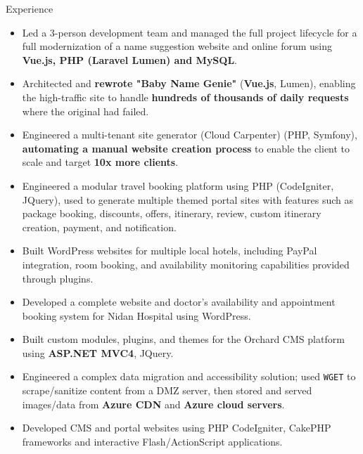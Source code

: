 \documentclass{resume} %
\begin{document}
\begin{rSection}{Experience}
\begin{itemize}
    \item Led a 3-person development team and managed the full project lifecycle for a full modernization of a name suggestion website and online forum using \textbf{Vue.js, PHP (Laravel Lumen) and MySQL}.
    \item Architected and \textbf{rewrote "Baby Name Genie"} (\textbf{Vue.js}, Lumen), enabling the high-traffic site to handle \textbf{hundreds of thousands of daily requests} where the original had failed.
    \item Engineered a multi-tenant site generator (Cloud Carpenter) (PHP, Symfony), \textbf{automating a manual website creation process} to enable the client to scale and target \textbf{10x more clients}.
\end{itemize}

\begin{itemize}
     \item Engineered a modular travel booking platform using PHP (CodeIgniter, JQuery), used to generate multiple themed portal sites with features such as package booking, discounts, offers, itinerary, review, custom itinerary creation, payment, and notification.
    \item Built WordPress websites for multiple local hotels, including PayPal integration, room booking, and availability monitoring capabilities provided through plugins.
    \item Developed a complete website and doctor's availability and appointment booking system for Nidan Hospital using WordPress.
\end{itemize}

\begin{itemize}
    \item Built custom modules, plugins, and themes for the Orchard CMS platform using \textbf{ASP.NET MVC4}, JQuery.
    \item Engineered a complex data migration and accessibility solution; used \texttt{WGET} to scrape/sanitize content from a DMZ server, then stored and served images/data from \textbf{Azure CDN} and \textbf{Azure cloud servers}.
\end{itemize}

\begin{itemize}
    \item Developed CMS and portal websites using PHP CodeIgniter, CakePHP frameworks and interactive Flash/ActionScript applications.
\end{itemize}


\end{rSection}
\end{document}

